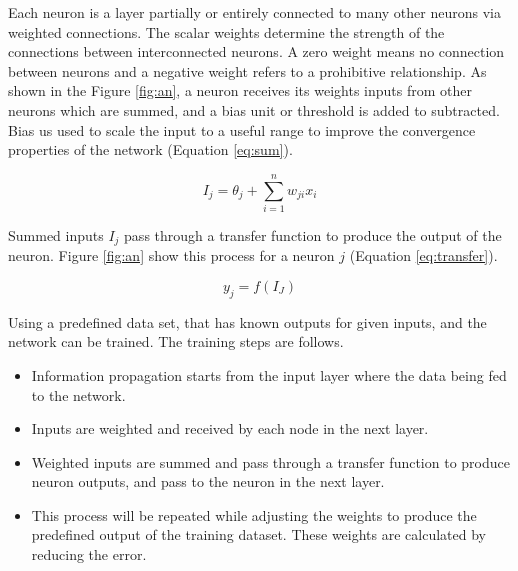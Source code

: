 Each neuron is a layer partially or entirely connected to many other neurons via weighted connections. The scalar weights determine the strength of the connections between interconnected neurons. A zero weight means no connection between neurons and a negative weight refers to a prohibitive relationship. As shown in the Figure \ref{fig:an}, a neuron receives its weights inputs from other neurons which are summed, and a bias unit or threshold is added to subtracted. Bias us used to scale the input to a useful range to improve the convergence properties of the network (Equation \ref{eq:sum}).

\begin{equation}
I_j = \theta_j + \sum_{i=1}^{n} w_{ji}x_i
\label{eq:sum}
\end{equation}

Summed inputs $I_j$ pass through a transfer function to produce the output of the neuron. Figure \ref{fig:an} show this process for a neuron $j$ (Equation \ref{eq:transfer}).

\begin{equation}
y_j = f(I_J)
\label{eq:transfer}
\end{equation}

Using a predefined data set, that has known outputs for given inputs, and the network can be trained. The training steps are follows.

\begin{itemize}
\item Information propagation starts from the input layer where the data being fed to the network.
\item Inputs are weighted and received by each node in the next layer. 
\item Weighted inputs are summed and pass through a transfer function to produce neuron outputs, and pass to the neuron in the next layer. 
\item This process will be repeated while adjusting the weights to produce the predefined output of the training dataset. These weights are calculated by reducing the error.  
\end{itemize}


